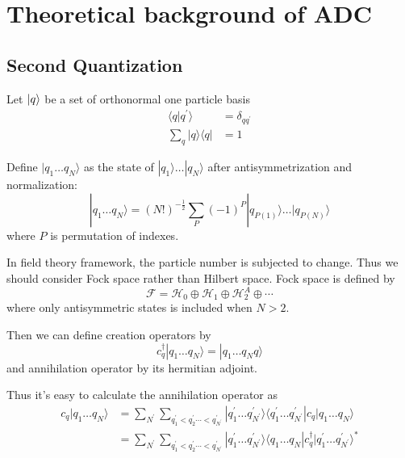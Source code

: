 \section{Theoretical background of ADC}

\subsection{Second Quantization}
Let $\ket{q}$ be a set of orthonormal one particle basis
\begin{equation}
\begin{aligned}
\langle q | q^{\prime}\rangle &=\delta_{q q^{\prime}} \\ \sum_{q} | q \rangle\langle q |&=1
\end{aligned}
\end{equation}

Define $| q_{1} \ldots q_{N} \rangle$ as the state of $| q_{1} \rangle \dots | q_{N} \rangle$ after antisymmetrization and normalization:
\begin{equation}
| q_{1} \ldots q_{N} \rangle =(N !)^{-\frac{1}{2}} \sum_{P}(-1)^{P} | q_{P(1)} \rangle \ldots | q_{P(N)} \rangle
\end{equation}
where $P$ is permutation of indexes.

In field theory framework, the particle number is subjected to change.
Thus we should consider Fock space rather than Hilbert space.
Fock space is defined by
\begin{equation}
\mathcal{F}=\mathcal{H}_{0} \oplus \mathcal{H}_{1} \oplus \mathcal{H}_{2}^{A} \oplus \cdots
\end{equation}
where only antisymmetric states is included when $N>2$.

Then we can define creation operators by 
\begin{equation}
c_{q}^{\dagger} | q_{1} \ldots q_{N} \rangle=| q_{1} \ldots q_{N} q \rangle
\end{equation}
and annihilation operator by its hermitian adjoint.

Thus it's easy to calculate the annihilation operator as
\begin{equation}
\begin{aligned}
	c_{q} | q_{1} \ldots q_{N} \rangle&=\sum_{N^{\prime}} \sum_{q_{1}^{\prime}<q_{2}^{\prime} \cdots<q_{N^{\prime}}^{\prime}} | q_{1}^{\prime} \ldots q_{N^{\prime}}^{\prime} \rangle\langle q_{1}^{\prime} \ldots q_{N^{\prime}}^{\prime}|c_{q}| q_{1} \ldots q_{N}\rangle
	\\
	&=\sum_{N^{\prime}} \sum_{q_{1}^{\prime}<q_{2}^{\prime} \cdots<q_{N^{\prime}}^{\prime}} | q_{1}^{\prime} \ldots q_{N^{\prime}}^{\prime} \rangle\langle q_{1} \ldots q_{N}|c_{q}^{\dagger}| q_{1}^{\prime} \ldots q_{N^{\prime}}^{\prime}\rangle^{*}
\end{aligned}
\end{equation}

